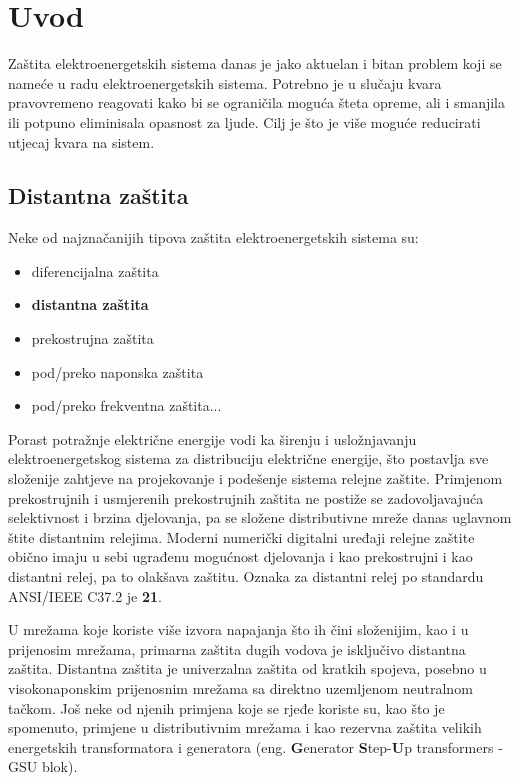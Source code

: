 \chapter{Uvod}

Zaštita elektroenergetskih sistema danas je jako aktuelan i bitan problem koji se nameće u radu elektroenergetskih sistema. Potrebno je u slučaju kvara pravovremeno reagovati kako bi se ograničila moguća šteta opreme, ali i smanjila ili potpuno eliminisala opasnost za ljude. Cilj je što je više moguće reducirati utjecaj kvara na sistem.

\section{Distantna zaštita}

Neke od najznačanijih tipova zaštita elektroenergetskih sistema su:

\begin{itemize}
    \item diferencijalna zaštita
    \item \textbf{distantna zaštita}
    \item prekostrujna zaštita
    \item pod/preko naponska zaštita
    \item pod/preko frekventna zaštita... \cite{prva}
\end{itemize}

Porast potražnje električne energije vodi ka širenju i
usložnjavanju elektroenergetskog sistema za distribuciju električne energije, što postavlja sve složenije zahtjeve na projekovanje i podešenje sistema relejne zaštite. Primjenom prekostrujnih i usmjerenih prekostrujnih zaštita ne postiže se zadovoljavajuća selektivnost i brzina djelovanja, pa se složene distributivne mreže danas uglavnom štite distantnim relejima. Moderni numerički digitalni uređaji relejne zaštite obično imaju u sebi ugrađenu mogućnost djelovanja i kao prekostrujni i kao distantni relej, pa to olakšava zaštitu. \cite{druga} Oznaka za distantni relej po standardu ANSI/IEEE C37.2 je \textbf{21}.

U mrežama koje koriste više izvora napajanja što ih čini složenijim, kao i u prijenosim mrežama, primarna zaštita dugih vodova je isključivo distantna zaštita. Distantna zaštita je univerzalna zaštita od kratkih spojeva, posebno u visokonaponskim prijenosnim mrežama sa direktno uzemljenom neutralnom tačkom. Još neke od njenih primjena koje se rjeđe koriste su, kao što je spomenuto, primjene u distributivnim mrežama i kao rezervna zaštita velikih energetskih transformatora i generatora (eng. \textbf{G}enerator \textbf{S}tep-\textbf{U}p transformers - GSU blok). \cite{prva}

